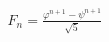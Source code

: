 \documentclass[preview]{standalone}
\begin{document}
\begin{align*}
F_n = \frac{\varphi^{n+1} - \psi^{n+1}}{\sqrt{5}}
\end{align*}
\end{document}

